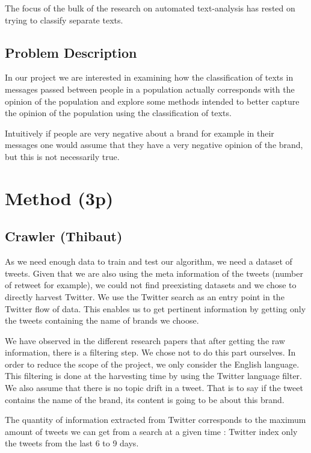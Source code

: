 \documentclass[a4paper,12pt]{report}
\begin{document}
The focus of the bulk of the research on automated text-analysis has rested on trying to classify separate texts.

\section{Problem Description}
In our project we are interested in examining how the classification of texts in messages passed between people in a population actually corresponds with the opinion of the population and explore some methods intended to better capture the opinion of the population using the classification of texts. 

Intuitively if people are very negative about a brand for example in their messages one would assume that they have a very negative opinion of the brand, but this is not necessarily true. 

\chapter{Method (3p)}

\section{Crawler (Thibaut)}

As we need enough data to train and test our algorithm, we need a dataset of tweets. Given that we are also using the meta information of the tweets (number of retweet for example), we could not find preexisting datasets and we chose to directly harvest Twitter.
We use the Twitter search as an entry point in the Twitter flow of data. This enables us to get pertinent information by getting only the tweets containing the name of brands we choose.

We have observed in the different research papers that after getting the raw information, there is a filtering step. We chose not to do this part ourselves. In order to reduce the scope of the project, we only consider the English language. This filtering is done at the harvesting time by using the Twitter language filter.
We also assume that there is no topic drift in a tweet. That is to say if the tweet contains the name of the brand, its content is going to be about this brand.

The quantity of information extracted from Twitter corresponds to the maximum amount of tweets we can get from a search at a given time : Twitter index only the tweets from the last 6 to 9 days.
\end{document}
